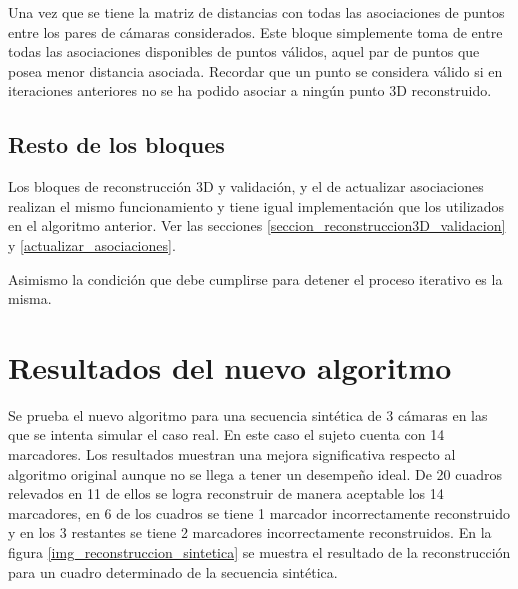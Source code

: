 Una vez que se tiene la matriz de distancias con todas las asociaciones de puntos entre los pares de cámaras considerados. Este bloque simplemente toma de entre todas las asociaciones disponibles de puntos válidos, aquel par de puntos que posea menor distancia asociada.
Recordar que un punto se considera válido si en iteraciones anteriores no se ha podido asociar a ningún punto 3D reconstruido.

\subsection{Resto de los bloques}

Los bloques de reconstrucción 3D y validación, y el de actualizar asociaciones realizan el mismo funcionamiento y tiene igual implementación que los utilizados en el algoritmo anterior. Ver las secciones \ref{seccion_reconstruccion3D_validacion} y \ref{actualizar_asociaciones}.

  Asimismo la condición que debe cumplirse para detener el proceso iterativo es la misma.
  
  
\section{Resultados del nuevo algoritmo}  
 
Se prueba el nuevo algoritmo para una secuencia sintética de 3 cámaras en las que se intenta simular el caso real. En este caso el sujeto cuenta con 14 marcadores. 
Los resultados muestran una mejora significativa respecto al algoritmo original
aunque no se llega a tener un desempeño ideal. 
De 20 cuadros relevados en 11 de ellos se logra reconstruir de manera aceptable los 14 marcadores, en 6 de los cuadros se tiene 1 marcador incorrectamente reconstruido y en los 3 restantes se tiene 2 marcadores incorrectamente reconstruidos.
En la figura \ref{img_reconstruccion_sintetica} se muestra el resultado de la reconstrucción para un cuadro  determinado de la secuencia sintética.\\

